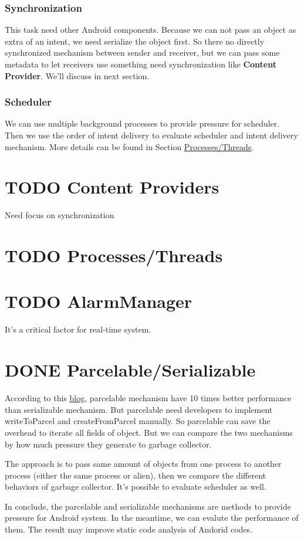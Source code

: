 \documentclass[11pt]{article}
\begin{document}
\subsubsection{Synchronization}
\label{sec-3-2-2}
This task need other Android components.
Because we can not pass an object as extra of an intent, we need serialize the object first.
So there no directly synchronized mechanism between sender and receiver,
but we can pass some metadata to let receivers use something need synchronization like \textbf{Content Provider}. We'll discuss in next section.

\subsubsection{Scheduler}
\label{sec-3-2-3}
We can use multiple background processes to provide pressure for scheduler.
Then we use the order of intent delivery to evaluate scheduler and intent delivery mechanism. More details can be found in Section \hyperref[Processes/Threads]{Processes/Threads}.

\section{{\bfseries\sffamily TODO} Content Providers}
\label{sec-4}
Need focus on synchronization

\section{{\bfseries\sffamily TODO} \label{Processes/Threads}Processes/Threads}
\label{sec-5}

\section{{\bfseries\sffamily TODO} AlarmManager}
\label{sec-6}
It's a critical factor for real-time system.

\section{{\bfseries\sffamily DONE} \label{Parcelable/Serializable}Parcelable/Serializable}
\label{sec-7}
According to this \href{http://www.developerphil.com/parcelable-vs-serializable/}{blog}, parcelable mechanism have 10 times better performance than serializable mechanism.
But parcelable need developers to implement writeToParcel and createFromParcel manually.
So parcelable can save the overhead to iterate all fields of object.
But we can compare the two mechanisms by how much pressure they generate to garbage collector.

The approach is to pass same amount of objects from one process to another process (either the same process or alien),
then we compare the different behaviors of garbage collector.
It's possible to evaluate scheduler as well.

In conclude, the parcelable and serializable mechanisms are methods to provide pressure for Android system.
In the meantime, we can evalute the performance of them.
The result may improve static code analysis of Andorid codes.
\end{document}
